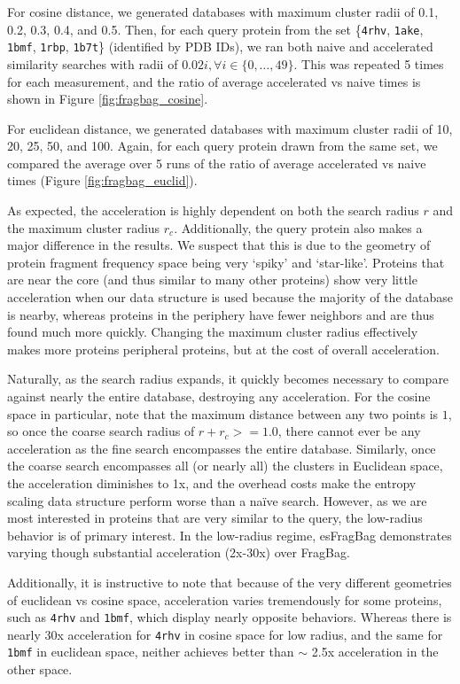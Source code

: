 \documentclass[review,preprint,12pt]{elsarticle}
\theoremstyle{definition}
\theoremstyle{remark}
\numberwithin{equation}{section}
\begin{document}
For cosine distance, we generated databases with maximum cluster radii of 0.1, 0.2, 0.3, 0.4, and 0.5.
Then, for each query protein from the set \{\texttt{4rhv}, \texttt{1ake}, \texttt{1bmf}, \texttt{1rbp}, \texttt{1b7t}\} (identified by PDB IDs), we ran both naive and accelerated similarity searches with radii of $0.02i, \forall i \in \{0,\ldots,49\}$.
This was repeated 5 times for each measurement, and the ratio of average accelerated vs naive times is shown in Figure \ref{fig:fragbag_cosine}.

For euclidean distance, we generated databases with maximum cluster radii of 10, 20, 25, 50, and 100.
Again, for each query protein drawn from the same set, we compared the average over 5 runs of the ratio of average accelerated vs naive times (Figure \ref{fig:fragbag_euclid}).

As expected, the acceleration is highly dependent on both the search radius $r$ and the maximum cluster radius $r_c$.
Additionally, the query protein also makes a major difference in the results.
We suspect that this is due to the geometry of protein fragment frequency space being very `spiky' and `star-like'.
Proteins that are near the core (and thus similar to many other proteins) show very little acceleration when our data structure is used because the majority of the database is nearby, whereas proteins in the periphery have fewer neighbors and are thus found much more quickly.
Changing the maximum cluster radius effectively makes more proteins peripheral proteins, but at the cost of overall acceleration.

Naturally, as the search radius expands, it quickly becomes necessary to compare against nearly the entire database, destroying any acceleration.
For the cosine space in particular, note that the maximum distance between any two points is $1$, so once the coarse search radius of $r+r_c >= 1.0$, there cannot ever be any acceleration as the fine search encompasses the entire database.
Similarly, once the coarse search encompasses all (or nearly all) the clusters in Euclidean space, the acceleration diminishes to 1x, and the overhead costs make the entropy scaling data structure perform worse than a na\"ive search.
However, as we are most interested in proteins that are very similar to the query, the low-radius behavior is of primary interest.
In the low-radius regime, esFragBag demonstrates varying though substantial acceleration (2x-30x) over FragBag.

Additionally, it is instructive to note that because of the very different geometries of euclidean vs cosine space, acceleration varies tremendously for some proteins, such as \texttt{4rhv} and \texttt{1bmf}, which display nearly opposite behaviors.
Whereas there is nearly 30x acceleration for \texttt{4rhv} in cosine space for low radius, and the same for \texttt{1bmf} in euclidean space, neither achieves better than $\sim$ 2.5x acceleration in the other space.
\end{document}
